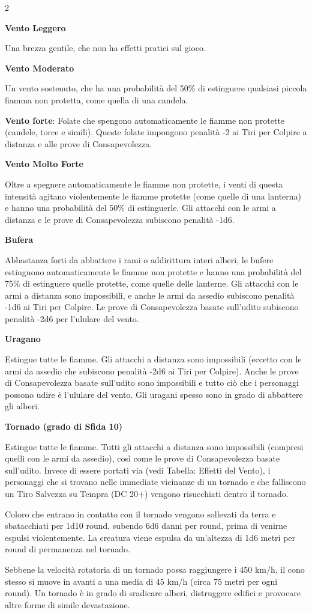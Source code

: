 \begin{multicols}{2}
\bigskip

\textbf{Vento Leggero}

Una brezza gentile, che non ha effetti pratici sul gioco.

\textbf{Vento Moderato}

Un vento sostenuto, che ha una probabilità del 50\% di estinguere qualsiasi piccola fiamma non protetta, come quella di una candela.

\textbf{Vento forte}: Folate che spengono automaticamente le fiamme non protette (candele, torce e simili). Queste folate impongono penalità -2 ai Tiri per Colpire a distanza e alle prove di Consapevolezza.

\textbf{Vento Molto Forte}

Oltre a spegnere automaticamente le fiamme non protette, i venti di questa intensità agitano violentemente le fiamme protette (come quelle di una lanterna) e hanno una probabilità del 50\% di estinguerle. Gli attacchi con le armi a distanza e le prove di Consapevolezza subiscono penalità -1d6.

\textbf{Bufera}

Abbastanza forti da abbattere i rami o addirittura interi alberi, le bufere estinguono automaticamente le fiamme non protette e hanno una probabilità del 75\% di estinguere quelle protette, come quelle delle lanterne. Gli attacchi con le armi a distanza sono impossibili, e anche le armi da assedio subiscono penalità -1d6 ai Tiri per Colpire. Le prove di Consapevolezza basate sull'udito subiscono penalità -2d6 per l'ululare del vento.

\textbf{Uragano}

Estingue tutte le fiamme. Gli attacchi a distanza sono impossibili (eccetto con le armi da assedio che subiscono penalità -2d6 ai Tiri per Colpire). Anche le prove di Consapevolezza basate sull'udito sono impossibili e tutto ciò che i personaggi possono udire è l'ululare del vento. Gli uragani spesso sono in grado di abbattere gli alberi.

\textbf{Tornado (grado di Sfida 10)}

Estingue tutte le fiamme. Tutti gli attacchi a distanza sono impossibili (compresi quelli con le armi da assedio), così come le prove di Consapevolezza basate sull'udito. Invece di essere portati via (vedi Tabella: Effetti del Vento), i personaggi che si trovano nelle immediate vicinanze di un tornado e che falliscono un Tiro Salvezza su Tempra (DC 20+) vengono risucchiati dentro il tornado.

Coloro che entrano in contatto con il tornado vengono sollevati da terra e sbatacchiati per 1d10 round, subendo 6d6 danni per round, prima di venirne espulsi violentemente. La creatura viene espulsa da un'altezza di 1d6 metri per round di permanenza nel tornado.

Sebbene la velocità rotatoria di un tornado possa raggiungere i 450 km/h, il cono stesso si muove in avanti a una media di 45 km/h (circa 75 metri per ogni round). Un tornado è in grado di sradicare alberi, distruggere edifici e provocare altre forme di simile devastazione.

\end{multicols}

